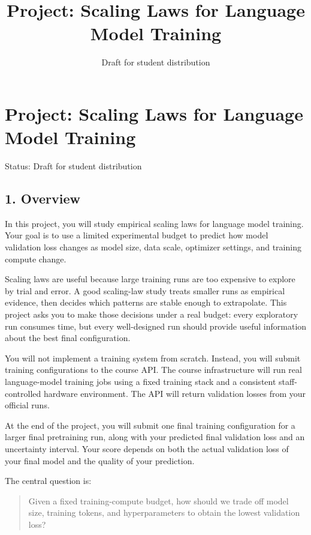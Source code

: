 \documentclass[
  11pt,
]{article}
\title{Project: Scaling Laws for Language Model Training}
\author{}
\date{Draft for student distribution}
\begin{document}
\maketitle

{
\hypersetup{linkcolor=}
\setcounter{tocdepth}{3}
\tableofcontents
}
\hypertarget{project-scaling-laws-for-language-model-training}{%
\section{Project: Scaling Laws for Language Model
Training}\label{project-scaling-laws-for-language-model-training}}

Status: Draft for student distribution

\hypertarget{overview}{%
\subsection{1. Overview}\label{overview}}

In this project, you will study empirical scaling laws for language
model training. Your goal is to use a limited experimental budget to
predict how model validation loss changes as model size, data scale,
optimizer settings, and training compute change.

Scaling laws are useful because large training runs are too expensive to
explore by trial and error. A good scaling-law study treats smaller runs
as empirical evidence, then decides which patterns are stable enough to
extrapolate. This project asks you to make those decisions under a real
budget: every exploratory run consumes time, but every well-designed run
should provide useful information about the best final configuration.

You will not implement a training system from scratch. Instead, you will
submit training configurations to the course API. The course
infrastructure will run real language-model training jobs using a fixed
training stack and a consistent staff-controlled hardware environment.
The API will return validation losses from your official runs.

At the end of the project, you will submit one final training
configuration for a larger final pretraining run, along with your
predicted final validation loss and an uncertainty interval. Your score
depends on both the actual validation loss of your final model and the
quality of your prediction.

The central question is:

\begin{quote}
Given a fixed training-compute budget, how should we trade off model
size, training tokens, and hyperparameters to obtain the lowest
validation loss?
\end{quote}
\end{document}
